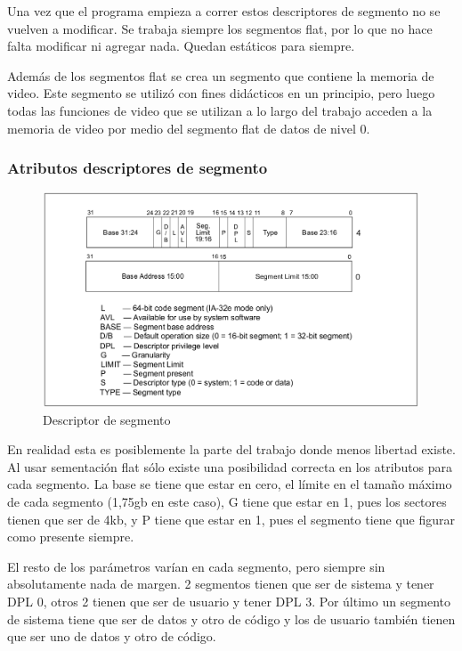	Una vez que el programa empieza a correr estos descriptores de segmento
no se vuelven a modificar. Se trabaja siempre los segmentos flat, por lo que no
hace falta modificar ni agregar nada. Quedan estáticos para siempre.

	Además de los segmentos flat se crea un segmento que contiene la memoria de video.
Este segmento se utilizó con fines didácticos en un principio, pero luego
todas las funciones de video que se utilizan a lo largo del trabajo acceden
a la memoria de video por medio del segmento flat de datos de nivel 0.

\subsubsection{Atributos descriptores de segmento}


\begin{figure}[h]
\begin{center}
  \includegraphics[scale=0.3]{secciones/dibujitos/descriptorDeSegmento.png}
\end{center}
\caption{Descriptor de segmento}
\label{fig:descriptorDeSegmento}
\end{figure}

	
	En realidad esta es posiblemente la parte del trabajo donde menos libertad
existe. Al usar sementación flat sólo existe una posibilidad correcta en los
atributos para cada segmento. La base se tiene que estar en cero, 
el límite en el tamaño máximo de cada segmento (1,75gb en este caso),
G tiene que estar en 1, pues los sectores tienen que ser de 4kb,
y P tiene que estar en 1, pues el segmento tiene que figurar como
presente siempre.

	El resto de los parámetros varían en cada segmento, pero siempre
sin absolutamente nada de margen. 2 segmentos tienen que ser de sistema
y tener DPL 0, otros 2 tienen que ser de usuario y tener DPL 3. Por último
un segmento de sistema tiene que ser de datos y otro de código y los
de usuario también tienen que ser uno de datos y otro de código.

